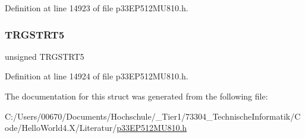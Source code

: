 Definition at line 14923 of file p33\+E\+P512\+M\+U810.\+h.

\mbox{\label{structtag_t_r_g_c_o_n4_b_i_t_s_aabeb06bb6258310e01e1a0cd96bf30ca}} 
\subsubsection{\texorpdfstring{T\+R\+G\+S\+T\+R\+T5}{TRGSTRT5}}
{\footnotesize\ttfamily unsigned T\+R\+G\+S\+T\+R\+T5}



Definition at line 14924 of file p33\+E\+P512\+M\+U810.\+h.



The documentation for this struct was generated from the following file\+:\begin{DoxyCompactItemize}
\item 
C\+:/\+Users/00670/\+Documents/\+Hochschule/\+\_\+\+Tier1/73304\+\_\+\+Technische\+Informatik/\+Code/\+Hello\+World4.\+X/\+Literatur/\hyperlink{p33_e_p512_m_u810_8h}{p33\+E\+P512\+M\+U810.\+h}\end{DoxyCompactItemize}
